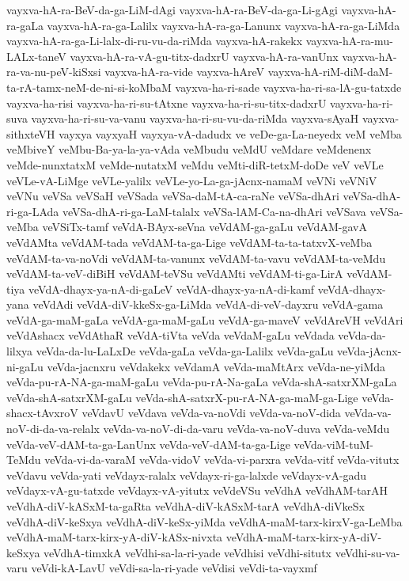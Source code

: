 {vayxva-hA-ra-BeV-da-ga-LiM-dAgi
vayxva-hA-ra-BeV-da-ga-Li-gAgi
vayxva-hA-ra-gaLa
vayxva-hA-ra-ga-Lalilx
vayxva-hA-ra-ga-Lanunx
vayxva-hA-ra-ga-LiMda
vayxva-hA-ra-ga-Li-lalx-di-ru-vu-da-riMda
vayxva-hA-rakekx
vayxva-hA-ra-mu-LALx-taneV
vayxva-hA-ra-vA-gu-titx-dadxrU
vayxva-hA-ra-vanUnx
vayxva-hA-ra-va-nu-peV-kiSxsi
vayxva-hA-ra-vide
vayxva-hAreV
vayxva-hA-riM-diM-daM-ta-rA-tamx-neM-de-ni-si-koMbaM
vayxva-ha-ri-sade
vayxva-ha-ri-sa-lA-gu-tatxde
vayxva-ha-risi
vayxva-ha-ri-su-tAtxne
vayxva-ha-ri-su-titx-dadxrU
vayxva-ha-ri-suva
vayxva-ha-ri-su-va-vanu
vayxva-ha-ri-su-vu-da-riMda
vayxva-sAyaH
vayxva-sithxteVH
vayxya
vayxyaH
vayxya-vA-dadudx
ve
veDe-ga-La-neyedx
veM
veMba
veMbiveY
veMbu-Ba-ya-la-ya-vAda
veMbudu
veMdU
veMdare
veMdenenx
veMde-nunxtatxM
veMde-nutatxM
veMdu
veMti-diR-tetxM-doDe
veV
veVLe
veVLe-vA-LiMge
veVLe-yalilx
veVLe-yo-La-ga-jAcnx-namaM
veVNi
veVNiV
veVNu
veVSa
veVSaH
veVSada
veVSa-daM-tA-ca-raNe
veVSa-dhAri
veVSa-dhA-ri-ga-LAda
veVSa-dhA-ri-ga-LaM-talalx
veVSa-lAM-Ca-na-dhAri
veVSava
veVSa-veMba
veVSiTx-tamf
veVdA-BAyx-seVna
veVdAM-ga-gaLu
veVdAM-gavA
veVdAMta
veVdAM-tada
veVdAM-ta-ga-Lige
veVdAM-ta-ta-tatxvX-veMba
veVdAM-ta-va-noVdi
veVdAM-ta-vanunx
veVdAM-ta-vavu
veVdAM-ta-veMdu
veVdAM-ta-veV-diBiH
veVdAM-teVSu
veVdAMti
veVdAM-ti-ga-LirA
veVdAM-tiya
veVdA-dhayx-ya-nA-di-gaLeV
veVdA-dhayx-ya-nA-di-kamf
veVdA-dhayx-yana
veVdAdi
veVdA-diV-kkeSx-ga-LiMda
veVdA-di-veV-dayxru
veVdA-gama
veVdA-ga-maM-gaLa
veVdA-ga-maM-gaLu
veVdA-ga-maveV
veVdAreVH
veVdAri
veVdAshacx
veVdAthaR
veVdA-tiVta
veVda
veVdaM-gaLu
veVdada
veVda-da-lilxya
veVda-da-lu-LaLxDe
veVda-gaLa
veVda-ga-Lalilx
veVda-gaLu
veVda-jAcnx-ni-gaLu
veVda-jacnxru
veVdakekx
veVdamA
veVda-maMtArx
veVda-ne-yiMda
veVda-pu-rA-NA-ga-maM-gaLu
veVda-pu-rA-Na-gaLa
veVda-shA-satxrXM-gaLa
veVda-shA-satxrXM-gaLu
veVda-shA-satxrX-pu-rA-NA-ga-maM-ga-Lige
veVda-shacx-tAvxroV
veVdavU
veVdava
veVda-va-noVdi
veVda-va-noV-dida
veVda-va-noV-di-da-va-relalx
veVda-va-noV-di-da-varu
veVda-va-noV-duva
veVda-veMdu
veVda-veV-dAM-ta-ga-LanUnx
veVda-veV-dAM-ta-ga-Lige
veVda-viM-tuM-TeMdu
veVda-vi-da-varaM
veVda-vidoV
veVda-vi-parxra
veVda-vitf
veVda-vitutx
veVdavu
veVda-yati
veVdayx-ralalx
veVdayx-ri-ga-lalxde
veVdayx-vA-gadu
veVdayx-vA-gu-tatxde
veVdayx-vA-yitutx
veVdeVSu
veVdhA
veVdhAM-tarAH
veVdhA-diV-kASxM-ta-gaRta
veVdhA-diV-kASxM-tarA
veVdhA-diVkeSx
veVdhA-diV-keSxya
veVdhA-diV-keSx-yiMda
veVdhA-maM-tarx-kirxV-ga-LeMba
veVdhA-maM-tarx-kirx-yA-diV-kASx-nivxta
veVdhA-maM-tarx-kirx-yA-diV-keSxya
veVdhA-timxkA
veVdhi-sa-la-ri-yade
veVdhisi
veVdhi-situtx
veVdhi-su-va-varu
veVdi-kA-LavU
veVdi-sa-la-ri-yade
veVdisi
veVdi-ta-vayxmf
}
